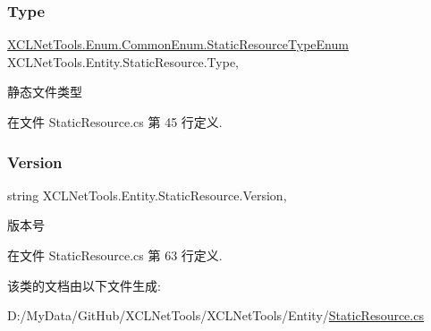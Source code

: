 \subsubsection{\texorpdfstring{Type}{Type}}
{\footnotesize\ttfamily \hyperlink{class_x_c_l_net_tools_1_1_enum_1_1_common_enum_abe6c6928080288df4a77ec8a59c537d1}{X\+C\+L\+Net\+Tools.\+Enum.\+Common\+Enum.\+Static\+Resource\+Type\+Enum} X\+C\+L\+Net\+Tools.\+Entity.\+Static\+Resource.\+Type\hspace{0.3cm}{\ttfamily [get]}, {\ttfamily [set]}}



静态文件类型 



在文件 Static\+Resource.\+cs 第 45 行定义.

\mbox{\label{class_x_c_l_net_tools_1_1_entity_1_1_static_resource_a4b85a7d2f6dc6169a10ebfe2987f2404}} 
\subsubsection{\texorpdfstring{Version}{Version}}
{\footnotesize\ttfamily string X\+C\+L\+Net\+Tools.\+Entity.\+Static\+Resource.\+Version\hspace{0.3cm}{\ttfamily [get]}, {\ttfamily [set]}}



版本号 



在文件 Static\+Resource.\+cs 第 63 行定义.



该类的文档由以下文件生成\+:\begin{DoxyCompactItemize}
\item 
D\+:/\+My\+Data/\+Git\+Hub/\+X\+C\+L\+Net\+Tools/\+X\+C\+L\+Net\+Tools/\+Entity/\hyperlink{_static_resource_8cs}{Static\+Resource.\+cs}\end{DoxyCompactItemize}
